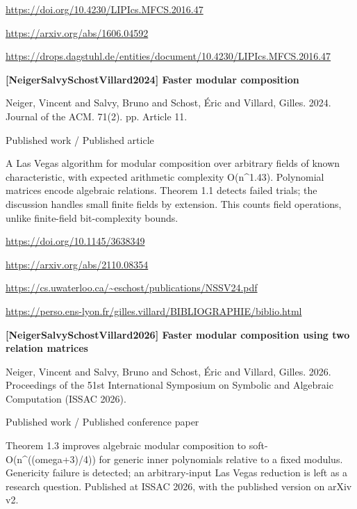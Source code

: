 \documentclass[11pt,a4paper,oneside,openany]{book}
\begin{document}
{\footnotesize\url{https://doi.org/10.4230/LIPIcs.MFCS.2016.47}}\par
{\footnotesize\url{https://arxiv.org/abs/1606.04592}}\par
{\footnotesize\url{https://drops.dagstuhl.de/entities/document/10.4230/LIPIcs.MFCS.2016.47}}\par
\vspace{9pt}
\hypertarget{ref:NeigerSalvySchostVillard2024}{}
{\sffamily\bfseries\color{atlasgreen}[NeigerSalvySchostVillard2024] Faster modular composition}\par
\color{black} Neiger, Vincent and Salvy, Bruno and Schost, Éric and Villard, Gilles. 2024. Journal of the ACM. 71(2). pp. Article 11.\par
{\small\sffamily\color{atlasgold}Published work / Published article}\par
\color{black} A Las Vegas algorithm for modular composition over arbitrary fields of known characteristic, with expected arithmetic complexity O(n\textasciicircum{}1.43). Polynomial matrices encode algebraic relations. Theorem 1.1 detects failed trials; the discussion handles small finite fields by extension. This counts field operations, unlike finite-field bit-complexity bounds.\par
{\footnotesize\url{https://doi.org/10.1145/3638349}}\par
{\footnotesize\url{https://arxiv.org/abs/2110.08354}}\par
{\footnotesize\url{https://cs.uwaterloo.ca/~eschost/publications/NSSV24.pdf}}\par
{\footnotesize\url{https://perso.ens-lyon.fr/gilles.villard/BIBLIOGRAPHIE/biblio.html}}\par
\vspace{9pt}
\hypertarget{ref:NeigerSalvySchostVillard2026}{}
{\sffamily\bfseries\color{atlasgreen}[NeigerSalvySchostVillard2026] Faster modular composition using two relation matrices}\par
\color{black} Neiger, Vincent and Salvy, Bruno and Schost, Éric and Villard, Gilles. 2026. Proceedings of the 51st International Symposium on Symbolic and Algebraic Computation (ISSAC 2026).\par
{\small\sffamily\color{atlasgold}Published work / Published conference paper}\par
\color{black} Theorem 1.3 improves algebraic modular composition to soft-O(n\textasciicircum{}((omega+3)/4)) for generic inner polynomials relative to a fixed modulus. Genericity failure is detected; an arbitrary-input Las Vegas reduction is left as a research question. Published at ISSAC 2026, with the published version on arXiv v2.\par
\end{document}
